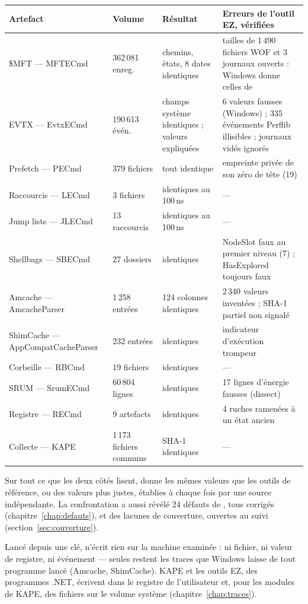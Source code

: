 \documentclass[11pt,a4paper,oneside]{report}
\begin{document}
\begin{longtable}{@{}L{3.2cm}L{2.4cm}L{4.5cm}L{5.0cm}@{}}
\toprule
\textbf{Artefact} & \textbf{Volume} & \textbf{Résultat} & \textbf{Erreurs de l'outil EZ, vérifiées} \\
\midrule\endhead
\$MFT --- MFTECmd & 362\,081 enreg. & chemins, états, 8 dates identiques & tailles de 1\,490 fichiers WOF et 3 journaux ouverts : Windows donne celles de \wac{} \\
EVTX --- EvtxECmd & 190\,613 évén. & champs système identiques ; valeurs expliquées & 6 valeurs fausses (Windows) ; 335 événements Perflib illisibles ; journaux vidés ignorés \\
Prefetch --- PECmd & 379 fichiers & tout identique & empreinte privée de son zéro de tête (19) \\
Raccourcis --- LECmd & 3 fichiers & identiques au 100\,ns & --- \\
Jump lists --- JLECmd & 13 raccourcis & identiques au 100\,ns & --- \\
Shellbags --- SBECmd & 27 dossiers & identiques & NodeSlot faux au premier niveau (7) ; HasExplored toujours faux \\
Amcache --- AmcacheParser & 1\,258 entrées & 124 colonnes identiques & 2\,340 valeurs inventées ; SHA-1 partiel non signalé \\
ShimCache --- AppCompat\-Cache\-Parser & 232 entrées & identiques & indicateur d'exécution trompeur \\
Corbeille --- RBCmd & 19 fichiers & identiques & --- \\
SRUM --- SrumECmd & 60\,804 lignes & identiques & 17 lignes d'énergie fausses (dissect) \\
Registre --- RECmd & 9 artefacts & identiques & 4 ruches ramenées à un état ancien \\
Collecte --- KAPE & 1\,173 fichiers communs & SHA-1 identiques & --- \\
\bottomrule
\end{longtable}

\begin{note}
Sur tout ce que les deux côtés lisent, \wac{} donne les mêmes valeurs que les
outils de référence, ou des valeurs plus justes, établies à chaque fois par une
source indépendante. La confrontation a aussi révélé 24 défauts de \wac{}, tous
corrigés (chapitre~\ref{chap:defauts}), et des lacunes de couverture, ouvertes
au suivi (section~\ref{sec:couverture}).

Lancé depuis une clé, \wac{} n'écrit rien sur la machine examinée : ni fichier,
ni valeur de registre, ni événement --- seules restent les traces que Windows
laisse de tout programme lancé (Amcache, ShimCache). KAPE et les outils EZ, des
programmes .NET, écrivent dans le registre de l'utilisateur et, pour les
modules de KAPE, des fichiers sur le volume système
(chapitre~\ref{chap:traces}).
\end{note}
\end{document}

